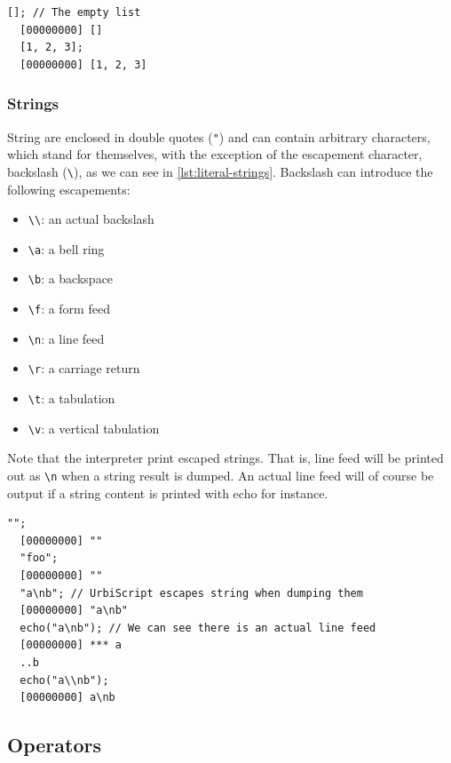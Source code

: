 \documentclass[openright,twoside,12pt]{report}
\newcommand   {\floatpos}          {htbp}
\newcommand{\lst}[1]{\autoref{lst:#1}}
\begin{document}
\begin{lstlisting}[caption=Literal lists,label=lst:literal-lists,float=\floatpos]
  []; // The empty list
  [00000000] []
  [1, 2, 3];
  [00000000] [1, 2, 3]
\end{lstlisting}

\subsubsection{Strings}

String are enclosed in double quotes (\lstinline|"|) and can contain
arbitrary characters, which stand for themselves, with the exception
of the escapement character, backslash (\lstinline|\|), as we can see
in \lst{literal-strings}. Backslash can introduce the following escapements:

\begin{itemize}
  \item \lstinline |\\|: an actual backslash
  \item \lstinline|\a|: a bell ring
  \item \lstinline|\b|: a backspace
  \item \lstinline|\f|: a form feed
  \item \lstinline|\n|: a line feed
  \item \lstinline|\r|: a carriage return
  \item \lstinline|\t|: a tabulation
  \item \lstinline|\v|: a vertical tabulation
\end{itemize}

Note that the interpreter print escaped strings. That is, line feed
will be printed out as \lstinline|\n| when a string result is
dumped. An actual line feed will of course be output if a string
content is printed with echo for instance.

\begin{lstlisting}[caption=Literal strings,label=lst:literal-strings,float=\floatpos]
  "";
  [00000000] ""
  "foo";
  [00000000] ""
  "a\nb"; // UrbiScript escapes string when dumping them
  [00000000] "a\nb"
  echo("a\nb"); // We can see there is an actual line feed
  [00000000] *** a
  ..b
  echo("a\\nb");
  [00000000] a\nb
\end{lstlisting}

\subsection{Operators}
\end{document}
